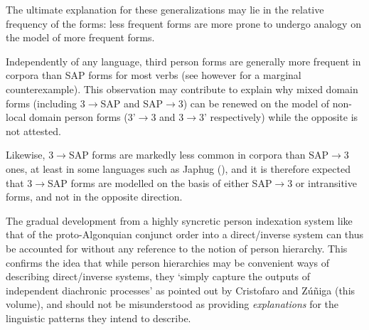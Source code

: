 \documentclass[twoside,a4paper,11pt]{article}
\begin{document}
The ultimate explanation for these generalizations may lie in the relative frequency of the forms: less frequent forms are more prone to undergo analogy on the model of more frequent forms. 

Independently of any language, third person forms are generally more frequent in corpora than SAP forms for most verbs (see however \citealt{jacques16ebde} for a marginal counterexample).  This observation may contribute to explain why mixed domain forms (including 3$\rightarrow$SAP and SAP$\rightarrow$3) can be renewed on the model of non-local domain person forms (3'$\rightarrow$3 and 3$\rightarrow$3' respectively) while the opposite is not attested.
 
Likewise, 3$\rightarrow$SAP forms are markedly less common in corpora than SAP$\rightarrow$3 ones, at least in some languages such as Japhug (\citealt{jacques10inverse}), and it is therefore expected that 3$\rightarrow$SAP forms are modelled on the basis of either SAP$\rightarrow$3 or intransitive forms, and not in the opposite direction.

 The gradual development from a highly syncretic person indexation system like that of the proto-Algonquian conjunct order into a direct/inverse system can thus be accounted for without any reference to the notion of person hierarchy. This confirms the idea that while person hierarchies may be convenient ways of describing direct/inverse systems, they `simply capture the outputs of independent diachronic processes' as pointed out by Cristofaro and Zúñiga (this volume), and should not be misunderstood as providing \textit{explanations} for the linguistic patterns they intend to describe.

 
 
\end{document}

